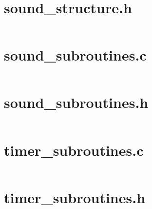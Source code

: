 \documentclass[letterpaper,twoside]{article}
\begin{document}
\section{sound\_structure.h}
\inputminted[breaklines]{c}{../src/sound_structure.h}
\newpage
\section{sound\_subroutines.c}
\inputminted[breaklines]{c}{../src/sound_subroutines.c}
\newpage
\section{sound\_subroutines.h}
\inputminted[breaklines]{c}{../src/sound_subroutines.h}
\newpage
\section{timer\_subroutines.c}
\inputminted[breaklines]{c}{../src/timer_subroutines.c}
\newpage
\section{timer\_subroutines.h}
\inputminted[breaklines]{c}{../src/timer_subroutines.h}
\end{document}
